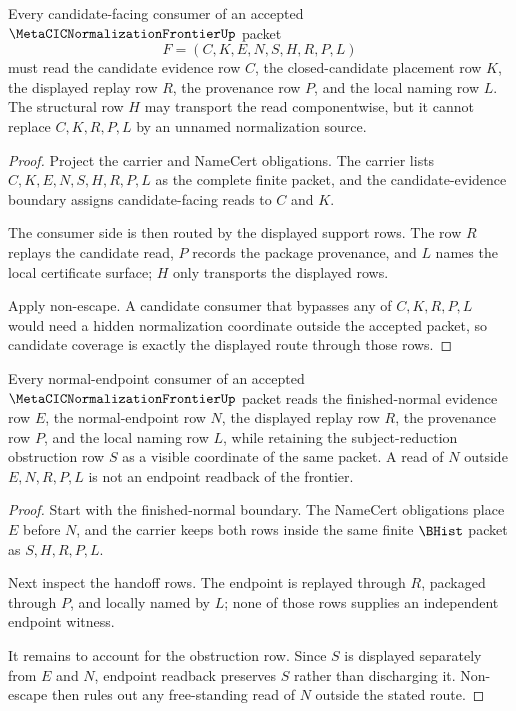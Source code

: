 \begin{theorem}
\label{thm:metacic-normalization-frontier-candidate-coverage}
Every candidate-facing consumer of an accepted $\MetaCICNormalizationFrontierUp$ packet
$$
F=(C,K,E,N,S,H,R,P,L)
$$
must read the candidate evidence row $C$, the closed-candidate placement row $K$, the displayed replay row $R$, the provenance row $P$, and the local naming row $L$. The structural row $H$ may transport the read componentwise, but it cannot replace $C,K,R,P,L$ by an unnamed normalization source.
\end{theorem}
\begin{proof}
Project the carrier and NameCert obligations. The carrier lists $C,K,E,N,S,H,R,P,L$ as the complete finite packet, and the candidate-evidence boundary assigns candidate-facing reads to $C$ and $K$.

The consumer side is then routed by the displayed support rows. The row $R$ replays the candidate read, $P$ records the package provenance, and $L$ names the local certificate surface; $H$ only transports the displayed rows.

Apply non-escape. A candidate consumer that bypasses any of $C,K,R,P,L$ would need a hidden normalization coordinate outside the accepted packet, so candidate coverage is exactly the displayed route through those rows.
\end{proof}

\begin{theorem}
\label{thm:metacic-normalization-frontier-endpoint-readback}
Every normal-endpoint consumer of an accepted $\MetaCICNormalizationFrontierUp$ packet reads the finished-normal evidence row $E$, the normal-endpoint row $N$, the displayed replay row $R$, the provenance row $P$, and the local naming row $L$, while retaining the subject-reduction obstruction row $S$ as a visible coordinate of the same packet. A read of $N$ outside $E,N,R,P,L$ is not an endpoint readback of the frontier.
\end{theorem}
\begin{proof}
Start with the finished-normal boundary. The NameCert obligations place $E$ before $N$, and the carrier keeps both rows inside the same finite $\BHist$ packet as $S,H,R,P,L$.

Next inspect the handoff rows. The endpoint is replayed through $R$, packaged through $P$, and locally named by $L$; none of those rows supplies an independent endpoint witness.

It remains to account for the obstruction row. Since $S$ is displayed separately from $E$ and $N$, endpoint readback preserves $S$ rather than discharging it. Non-escape then rules out any free-standing read of $N$ outside the stated route.
\end{proof}

